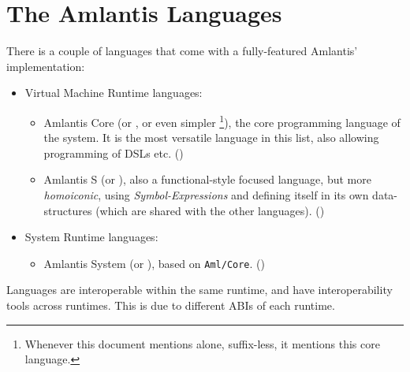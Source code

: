 \section*{The Amlantis Languages}
\label{sec:amlantis-languages}

There is a couple of languages that come with a fully-featured Amlantis' implementation:

\begin{itemize}
  \item Virtual Machine Runtime languages:
    \begin{itemize}
      \item Amlantis Core (or \AmlCore, or even simpler \Aml\footnote{Whenever this document mentions \Aml alone, suffix-less, it mentions this core language.}), the core programming language of the system. It is the most versatile language in this list, also allowing programming of DSLs etc. ()
      \item Amlantis S (or \AmlS), also a functional-style focused language, but more {\em homoiconic}, using {\em Symbol-Expressions} and defining itself in its own data-structures (which are shared with the other  languages). ()
    \end{itemize}
  \item System Runtime languages:
    \begin{itemize}
      \item Amlantis System (or \AmlSystem), based on \mbox{\lstinline!Aml/Core!}. ()
    \end{itemize}
\end{itemize}

Languages are interoperable within the same runtime, and have interoperability tools across runtimes. This is due to different ABIs of each runtime. 







